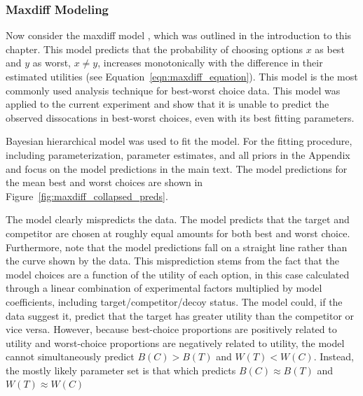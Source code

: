 \subsubsection{Maxdiff Modeling}

Now consider the maxdiff model \parencite{marleyProbabilisticModelsBest2005}, which was outlined in the introduction to this chapter. This model predicts that the probability of choosing options $x$ as best and $y$ as worst, $x \neq y$, increases monotonically with the difference in their estimated utilities (see Equation~\ref{eqn:maxdiff_equation}). This model is the most commonly used analysis technique for best-worst choice data. This model was applied to the current experiment and show that it is unable to predict the observed dissocations in best-worst choices, even with its best fitting parameters.

Bayesian hierarchical model was used to fit the model. For the fitting procedure, including parameterization, parameter estimates, and all priors in the Appendix and focus on the model predictions in the main text. The model predictions for the mean best and worst choices are shown in Figure~\ref{fig:maxdiff_collapsed_preds}.

The model clearly mispredicts the data. The model predicts that the target and competitor are chosen at roughly equal amounts for both best and worst choice. Furthermore, note that the model predictions fall on a straight line rather than the curve shown by the data. This misprediction stems from the fact that the model choices are a function of the utility of each option, in this case calculated through a linear combination of experimental factors multiplied by model coefficients, including target/competitor/decoy status. The model could, if the data suggest it, predict that the target has greater utility than the competitor or vice versa. However, because best-choice proportions are positively related to utility and worst-choice proportions are negatively related to utility, the model cannot simultaneously predict $B(C)>B(T)$ and $W(T)<W(C)$. Instead, the mostly likely parameter set is that which predicts $B(C) \approx B(T)$ and $W(T) \approx W(C)$

